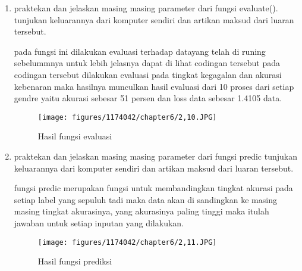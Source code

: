 \begin{enumerate}
\item praktekan dan jelaskan masing masing parameter dari fungsi evaluate().  tunjukan keluarannya dari komputer sendiri dan artikan maksud dari luaran tersebut.\par
\subitem pada fungsi ini dilakukan evaluasi terhadap datayang telah di runing sebelummnya untuk lebih jelasnya dapat di lihat codingan tersebut  pada codingan tersebut dilakukan evaluasi pada tingkat kegagalan dan akurasi kebenaran maka hasilnya munculkan hasil evaluasi dari 10 proses dari setiap gendre yaitu akurasi sebesar 51 persen dan loss data sebesar 1.4105 data.

\begin{figure}[ht]
\centering
\texttt{[image: figures/1174042/chapter6/2,10.JPG]}
\caption{Hasil fungsi evaluasi}
\label{contoh}
\end{figure}

\item praktekan dan jelaskan masing masing parameter dari fungsi predic  tunjukan keluarannya dari komputer sendiri dan artikan maksud dari luaran tersebut. \par 
\subitem fungsi predic merupakan fungsi untuk membandingkan tingkat akurasi pada setiap label yang sepuluh tadi maka data akan di sandingkan ke masing masing tingkat akurasinya, yang akurasinya paling tinggi maka itulah jawaban untuk setiap inputan yang dilakukan. 

\begin{figure}[ht]
\centering
\texttt{[image: figures/1174042/chapter6/2,11.JPG]}
\caption{Hasil fungsi prediksi}
\label{contoh}
\end{figure}

\end{enumerate}

